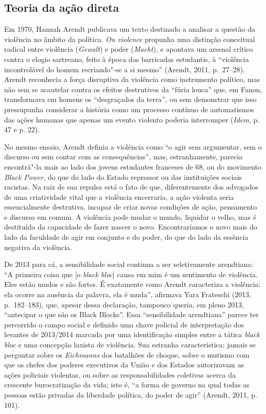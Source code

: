\subsection{Teoria da ação direta}

Em 1970, Hannah Arendt publicava um
texto destinado a analisar a questão da violência no âmbito da política.
\emph{On violence} propunha uma distinção conceitual radical entre
violência (\emph{Gewalt}) e poder (\emph{Macht}), e apontava um arsenal
crítico contra o elogio sartreano, feito à época das barricadas
estudantis, à ``violência incontrolável do homem recriando"-se a si
mesmo'' (Arendt, 2011, p.~27--28). Arendt reconhecia a força disruptiva
da violência como instrumento político, mas não sem se acautelar contra
os efeitos destrutivos da ``fúria louca'' que, em Fanon, transformava em
homens os ``desgraçados da terra'', ou sem demonstrar que isso
pressupunha considerar a história como um processo contínuo de
automatismos das ações humanas que apenas um evento violento poderia
interromper (\emph{Idem}, p. 47 e p. 22).

No mesmo ensaio, Arendt definia a violência como ``o agir sem
argumentar, sem o discurso ou sem contar com as consequências'', mas,
estranhamente, parecia encontrá"-la mais ao lado dos jovens estudantes
franceses de 68, ou do movimento \emph{Black Power}, do que do lado do
Estado repressor ou das instituições sociais racistas. Na raiz de sua
repulsa está o fato de que, diferentemente dos advogados de uma
criatividade vital que a violência encerraria, a ação violenta seria
essencialmente destrutiva, incapaz de criar novas condições de ação,
pensamento e discurso em comum. A violência pode mudar o mundo, liquidar
o velho, mas é destituída da capacidade de fazer nascer o novo.
Encontraríamos o novo mais do lado da faculdade de agir em conjunto e do
poder, do que do lado da essência negativa da violência.

De 2013 para cá, a sensibilidade social continua a ser seletivamente
arendtiana: ``A primeira coisa que {[}o \emph{black bloc}{]} causa em
mim é um sentimento de violência. Eles estão mudos e são fortes. É
exatamente como Arendt caracteriza a violência: ela ocorre na ausência
da palavra, ela é muda'', afirmava Yara Frateschi (2013, p.~182--183),
que, apesar dessa declaração, tampouco queria, em pleno 2013,
``antecipar o que são os Black Blocks''. Essa ``sensibilidade
arendtiana'' parece ter percorrido o campo social e definido uma chave
policial de interpretação dos levantes de 2013/2014 marcada por uma
identificação simples entre a tática \emph{black bloc} e uma concepção
laxista de violência. Sua estranha característica: jamais se perguntar
sobre os \emph{Eichmanns }dos batalhões de choque, sobre o mutismo com
que os chefes dos poderes executivos da União e dos Estados autorizavam
as ações policiais violentas, ou sobre as responsabilidades coletivas
acerca da crescente burocratização da vida; isto é, ``a forma de governo
na qual todas as pessoas estão privadas da liberdade política, do poder
de agir'' (Arendt, 2011, p. 101).

